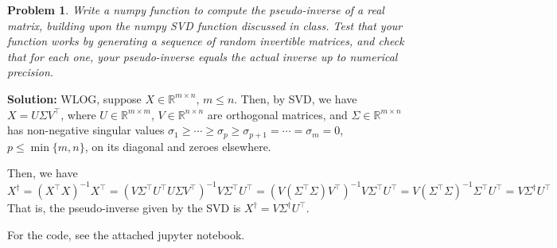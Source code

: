 \documentclass[11pt]{article}
\theoremstyle{plain} %
\newtheorem{problem}[theorem]{Problem}
\newenvironment{solution}
{\color{C2}\normalfont\begin{framed}\begingroup\textbf{Solution:} }
  {\endgroup\end{framed}}
\theoremstyle{remark}
\begin{document}
\begin{problem}
    Write a numpy function to compute the pseudo-inverse of a real matrix, building upon the numpy SVD function discussed in class. Test that your function works by generating a sequence of random invertible matrices, and check that for each one, your pseudo-inverse equals the actual inverse up to numerical precision.
\end{problem}

\begin{solution}
    WLOG, suppose $X\in \mathbb{R}^{m\times n}$, $m\le n$. Then, by SVD, we have $X = U\Sigma V^\top$, where $U\in \mathbb{R}^{m\times m}$, $V\in \mathbb{R}^{n\times n}$ are orthogonal matrices, and $\Sigma \in \mathbb{R}^{m\times n}$ has non-negative singular values $\sigma_1\ge \cdots \ge \sigma_p \ge \sigma_{p+1} = \cdots = \sigma_m = 0$, $p\le \min\{m, n\}$, on its diagonal and zeroes elsewhere.

    Then, we have $$
    X^{\dagger} = \left(X^\top X\right)^{-1} X^\top = \left(V\Sigma^\top U^\top U \Sigma V^\top\right)^{-1} V\Sigma^\top U^\top = \left(V \left(\Sigma^\top \Sigma\right) V^\top \right)^{-1} V\Sigma^\top U^\top = V \left(\Sigma^\top \Sigma\right)^{-1}\Sigma^\top U^\top  = V \Sigma^{\dagger} U^\top
    $$
    That is, the pseudo-inverse given by the SVD is $X^{\dagger} = V \Sigma^{\dagger} U^\top$.

    For the code, see the attached jupyter notebook.
\end{solution}
\end{document}
